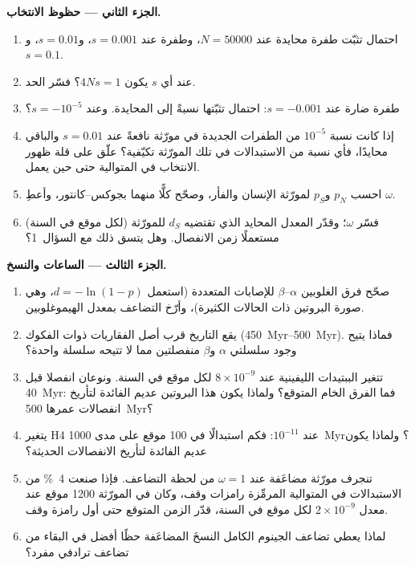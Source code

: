 \begin{problem}
\medskip
\noindent\textbf{الجزء الثاني --- حظوظ الانتخاب.}
\begin{enumerate}[resume]
  \item احتمال تثبّت طفرة محايدة عند $N = \num{50000}$،
        وطفرة عند $s = 0.001$، و$s = 0.01$، و$s = 0.1$.
  \item عند أي $s$ يكون $4Ns = 1$؟ فسّر الحد.
  \item طفرة ضارة عند $s = -0.001$: احتمال تثبّتها
        نسبةً إلى المحايدة. وعند $s = -10^{-5}$؟
  \item إذا كانت نسبة $10^{-5}$ من الطفرات الجديدة في مورّثة
        نافعةً عند $s = 0.01$ والباقي محايدًا، فأي نسبة من
        الاستبدالات في تلك المورّثة تكيّفية؟ علّق على قلة
        ظهور الانتخاب في المتوالية حتى حين يعمل.
  \item احسب $p_{N}$ و$p_{S}$ لمورّثة الإنسان والفأر، وصحّح
        كلًّا منهما بجوكس--كانتور، وأعطِ $\omega$.
  \item فسّر $\omega$؛ وقدّر المعدل المحايد الذي تقتضيه
        $d_{S}$ للمورّثة (لكل موقع في السنة) مستعملًا زمن
        الانفصال. وهل يتسق ذلك مع السؤال~1؟
\end{enumerate}

\medskip
\noindent\textbf{الجزء الثالث --- الساعات والنسخ.}
\begin{enumerate}[resume]
  \item صحّح فرق الغلوبين $\alpha$--$\beta$ للإصابات المتعددة
        (استعمل $d = -\ln(1 - p)$، وهي صورة البروتين ذات
        الحالات الكثيرة)، وأرّخ التضاعف بمعدل الهيموغلوبين.
  \item يقع التاريخ قرب أصل الفقاريات ذوات الفكوك
        (\qtyrange{450}{500}{Myr}). فماذا يتيح وجود سلسلتي
        $\alpha$ و$\beta$ منفصلتين مما لا تتيحه سلسلة واحدة؟
  \item تتغير الببتيدات الليفينية عند $8\times 10^{-9}$ لكل موقع في
        السنة. ونوعان انفصلا قبل \qty{40}{Myr}: فما الفرق الخام
        المتوقع؟ ولماذا يكون هذا البروتين عديم الفائدة لتأريخ
        انفصالات عمرها \qty{500}{Myr}؟
  \item يتغير  H4 عند $10^{-11}$: فكم استبدالًا في 100
        موقع على مدى \qty{1000}{Myr}؟ ولماذا يكون عديم الفائدة
        لتأريخ الانفصالات الحديثة؟
  \item تنجرف مورّثة مضاعَفة عند $\omega = 1$ من لحظة
        التضاعف. فإذا صنعت \qty{4}{\%} من الاستبدالات في
        المتوالية المرمِّزة رامزات وقف، وكان في المورّثة 1200
        موقع عند معدل $2\times
        10^{-9}$ لكل موقع في السنة، قدّر الزمن المتوقع حتى
        أول رامزة وقف.
  \item لماذا يعطي تضاعف الجينوم الكامل النسخَ المضاعَفة حظًا
        أفضل في البقاء من تضاعف ترادفي مفرد؟
\end{enumerate}


\end{problem}
